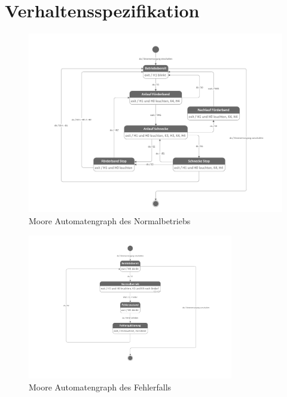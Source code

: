 \section{Verhaltensspezifikation}

\begin{figure}[H]
   \centering
   \includegraphics[width=1.0\textwidth]{Bilder/1. Konzept/Normalbetrieb.pdf}
   \caption[Automatengraph Normalbetrieb]{Moore Automatengraph des Normalbetriebs}
   \label{fig:Bild4.1}
\end{figure}

\begin{figure}[H]
   \centering
   \includegraphics[width=0.8\textwidth]{Bilder/1. Konzept/Fehlerfall.pdf}
   \caption[Automatengraph Fehlerfall]{Moore Automatengraph des Fehlerfalls}
   \label{fig:Bild4.2}
\end{figure}